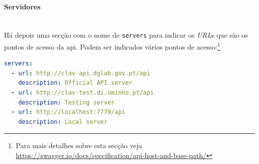 \vspace{-0.7cm}

\paragraph{Servidores} \mbox{} \\
Há depois uma secção com o nome de \texttt{servers} para indicar os \textit{URL}s que são os pontos de acesso 
da \acrshort{api}. Podem ser indicados vários pontos de 
acesso:\footnote{Para mais detalhes sobre esta secção veja \url{https://swagger.io/docs/specification/api-host-and-base-path/}}
\begin{lstlisting}[language=yaml, caption=Exemplo de secção \texttt{servers} indicando os \textit{URL}s e a descrição de cada na especificação \textit{OpenAPI}]
servers:
  - url: http://clav-api.dglab.gov.pt/api
    description: Official API server
  - url: http://clav-test.di.uminho.pt/api
    description: Testing server
  - url: http://localhost:7779/api
    description: Local server
\end{lstlisting}

\vspace{-0.7cm}


